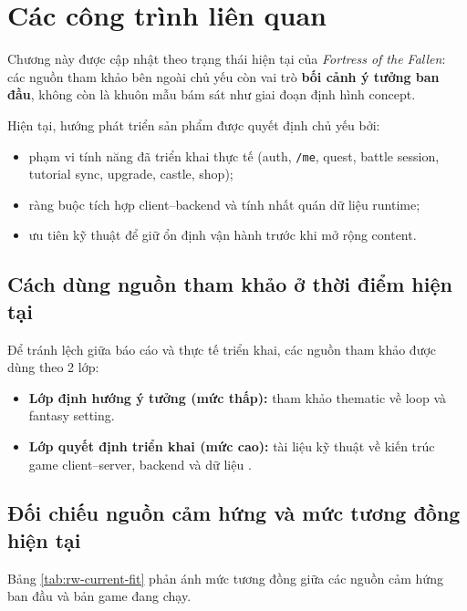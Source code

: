\section{Các công trình liên quan}
\label{sec:relatedworks}

Chương này được cập nhật theo trạng thái hiện tại của \textit{Fortress of the Fallen}: các nguồn tham khảo bên ngoài chủ yếu còn vai trò \textbf{bối cảnh ý tưởng ban đầu}, không còn là khuôn mẫu bám sát như giai đoạn định hình concept.

Hiện tại, hướng phát triển sản phẩm được quyết định chủ yếu bởi:
\begin{itemize}
    \item phạm vi tính năng đã triển khai thực tế (auth, \texttt{/me}, quest, battle session, tutorial sync, upgrade, castle, shop);
    \item ràng buộc tích hợp client--backend và tính nhất quán dữ liệu runtime;
    \item ưu tiên kỹ thuật để giữ ổn định vận hành trước khi mở rộng content.
\end{itemize}

\subsection{Cách dùng nguồn tham khảo ở thời điểm hiện tại}
\label{subsec:rw-method}

Để tránh lệch giữa báo cáo và thực tế triển khai, các nguồn tham khảo được dùng theo 2 lớp:
\begin{itemize}
    \item \textbf{Lớp định hướng ý tưởng (mức thấp):} tham khảo thematic về loop và fantasy setting.
    \item \textbf{Lớp quyết định triển khai (mức cao):} tài liệu kỹ thuật về kiến trúc game client--server, backend và dữ liệu \cite{schell-art,adams-game-design,gregory-engine,gaffer-networking,moriarty-networked,unity-manual,nest-docs,nodejs-docs,mongodb-guide,redis-in-action}.
\end{itemize}

\subsection{Đối chiếu nguồn cảm hứng và mức tương đồng hiện tại}
\label{subsec:rw-status}

Bảng \ref{tab:rw-current-fit} phản ánh mức tương đồng giữa các nguồn cảm hứng ban đầu và bản game đang chạy.

